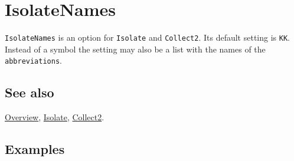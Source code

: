 \documentclass[../FeynCalcManual.tex]{subfiles}
\begin{document}
\hypertarget{isolatenames}{
\section{IsolateNames}\label{isolatenames}}

\texttt{IsolateNames} is an option for \texttt{Isolate} and
\texttt{Collect2}. Its default setting is \texttt{KK}. Instead of a
symbol the setting may also be a list with the names of the
\texttt{abbreviations}.

\subsection{See also}

\hyperlink{toc}{Overview}, \hyperlink{isolate}{Isolate},
\hyperlink{collect2}{Collect2}.

\subsection{Examples}
\end{document}

